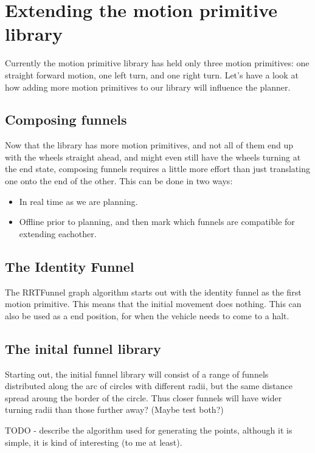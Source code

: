 
\section{Extending the motion primitive library}

Currently the motion primitive library has held only three motion primitives:
one straight forward motion, one left turn, and one right turn. Let's have a
look at how adding more motion primitives to our library will influence the
planner.

\subsection{Composing funnels}

Now that the library has more motion primitives, and not all of them end up with
the wheels straight ahead, and might even still have the wheels turning at the
end state, composing funnels requires a little more effort than just
translating one onto the end of the other. This can be done in two ways:
\begin{itemize}
  \item In real time as we are planning.
  \item Offline prior to planning, and then mark which funnels are compatible
    for extending eachother.
\end{itemize}

\subsection{The Identity Funnel}

The RRTFunnel graph algorithm starts out with the identity funnel as the first
motion primitive. This means that the initial movement does nothing. This can
also be used as a end position, for when the vehicle needs to come to a halt.

\subsection{The inital funnel library}

Starting out, the initial funnel library will consist of a range of funnels
distributed along the arc of circles with different radii, but the same distance
spread aroung the border of the circle. Thus closer funnels will have wider
turning radii than those further away? (Maybe test both?)

TODO - describe the algorithm used for generating the points, although it is
simple, it is kind of interesting (to me at least).